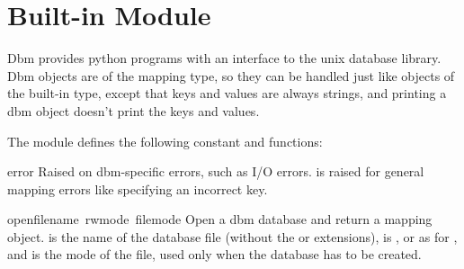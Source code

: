 \section{Built-in Module }

Dbm provides python programs with an interface to the unix 
database library.  Dbm objects are of the mapping type, so they can be
handled just like objects of the built-in  type,
except that keys and values are always strings, and printing a dbm
object doesn't print the keys and values.

The module defines the following constant and functions:

\renewcommand{\indexsubitem}{(in module dbm)}
\begin{excdesc}{error}
Raised on dbm-specific errors, such as I/O errors.  is
raised for general mapping errors like specifying an incorrect key.
\end{excdesc}

\begin{funcdesc}{open}{filename\, rwmode\, filemode}
Open a dbm database and return a mapping object.   is
the name of the database file (without the  or 
extensions),  is ,  or  as for
, and  is the \UNIX{} mode of the file, used only
when the database has to be created.
\end{funcdesc}
